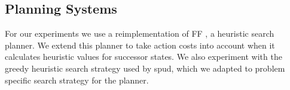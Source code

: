 


\subsection{Planning Systems}
For our experiments we use a reimplementation of {\sc FF} \cite{hoffmannnebel2001}, a heuristic search planner. We extend this planner to take action costs into account when it calculates heuristic values for successor states. We also experiment with the greedy heuristic search strategy used by {\sc spud}, which we adapted to problem specific search strategy for the planner.

